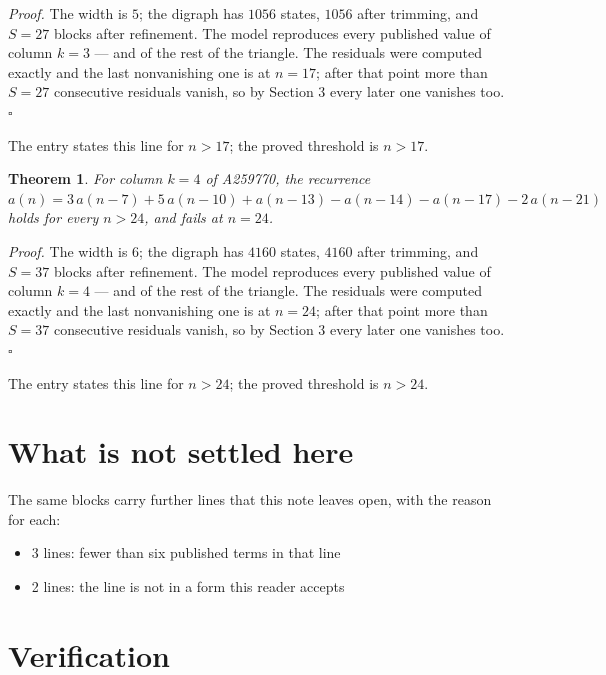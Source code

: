 \documentclass[11pt]{article}
\newtheorem{theorem}{Theorem}
\theoremstyle{definition}
\begin{document}
{\itshape Proof.} The width is $5$; the digraph has $1056$ states, $1056$ after trimming, and $S = 27$ blocks after refinement. The model reproduces every published value of column $k = 3$ --- and of the rest of the triangle. The residuals were computed exactly and the last nonvanishing one is at $n = 17$; after that point more than $S = 27$ consecutive residuals vanish, so by Section 3 every later one vanishes too. $\square$

The entry states this line for $n > 17$; the proved threshold is $n > 17$.

\begin{theorem} For column $k = 4$ of A259770, the recurrence $a(n) = 3\,a(n-7) + 5\,a(n-10) + a(n-13) - a(n-14) - a(n-17) - 2\,a(n-21)$ holds for every $n > 24$, and fails at $n = 24$.\end{theorem}

{\itshape Proof.} The width is $6$; the digraph has $4160$ states, $4160$ after trimming, and $S = 37$ blocks after refinement. The model reproduces every published value of column $k = 4$ --- and of the rest of the triangle. The residuals were computed exactly and the last nonvanishing one is at $n = 24$; after that point more than $S = 37$ consecutive residuals vanish, so by Section 3 every later one vanishes too. $\square$

The entry states this line for $n > 24$; the proved threshold is $n > 24$.

\section{What is not settled here}

The same blocks carry further lines that this note leaves open, with the reason for each:

\begin{itemize}

\item 3 lines: fewer than six published terms in that line

\item 2 lines: the line is not in a form this reader accepts

\end{itemize}

\section{Verification}
\end{document}
